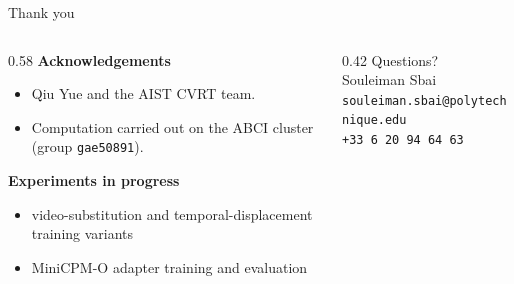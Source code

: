 \documentclass[aspectratio=169,11pt]{beamer}
\begin{document}
\begin{frame}{Thank you}
\begin{columns}[T]
\begin{column}{0.58\textwidth}
\textbf{Acknowledgements}
\begin{itemize}\footnotesize
\item Qiu Yue and the AIST CVRT team.
\item Computation carried out on the ABCI cluster (group \texttt{gae50891}).
\end{itemize}
\vspace{0.6em}
\textbf{Experiments in progress}
\begin{itemize}\footnotesize
\item video-substitution and temporal-displacement training variants
\item MiniCPM-O adapter training and evaluation
\end{itemize}
\end{column}
\begin{column}{0.42\textwidth}
\centering
\vspace{0.4em}
{\Large Questions?}\\[1.2em]
{\footnotesize \color{gray} Souleiman Sbai\\[2pt]
\texttt{souleiman.sbai@polytechnique.edu}\\[1pt] \texttt{+33 6 20 94 64 63}}
\end{column}
\end{columns}
\end{frame}
\end{document}
